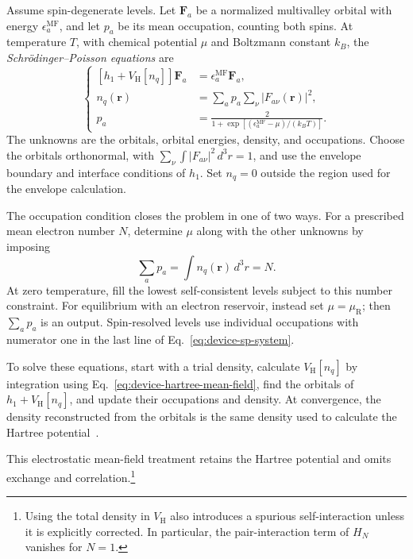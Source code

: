 Assume spin-degenerate levels. Let $\mathbf F_a$ be a normalized
multivalley orbital with energy $\epsilon_a^{\mathrm{MF}}$, and
let $p_a$ be its mean occupation, counting both spins. At
temperature $T$, with chemical potential $\mu$ and Boltzmann
constant $k_B$, the \emph{Schr\"odinger--Poisson equations} are
\begin{equation}
 \left\{
 \begin{aligned}
  [h_1+V_{\mathrm H}[n_q]]\mathbf F_a
       &=\epsilon_a^{\mathrm{MF}}\mathbf F_a,\\[3pt]
  n_q(\mathbf r)
       &=\sum_a p_a\sum_\nu|F_{a\nu}(\mathbf r)|^2,\\[3pt]
  p_a&=\frac{2}{1+\exp[(\epsilon_a^{\mathrm{MF}}-\mu)/(k_BT)]}.
 \end{aligned}
 \right.
 \label{eq:device-sp-system}
\end{equation}
The unknowns are the orbitals, orbital energies, density, and
occupations. Choose the orbitals orthonormal, with
$\sum_\nu\int|F_{a\nu}|^2\,d^3r=1$, and use the envelope
boundary and interface conditions of $h_1$.
Set $n_q=0$ outside the region used for the envelope calculation.

The occupation condition closes the problem in one of two ways.
For a prescribed mean electron number $N$, determine $\mu$
along with the other unknowns by imposing
\begin{equation}
 \sum_a p_a=\int n_q(\mathbf r)\,d^3r=N.
 \label{eq:device-sp-number}
\end{equation}
At zero temperature, fill the lowest self-consistent levels
subject to this number constraint. For equilibrium with an
electron reservoir, instead set $\mu=\mu_{\mathrm R}$; then
$\sum_a p_a$ is an output. Spin-resolved levels use individual
occupations with numerator one in the last line of
Eq.~\eqref{eq:device-sp-system}.

To solve these equations, start with a trial density, calculate
$V_{\mathrm H}[n_q]$ by integration using
Eq.~\eqref{eq:device-hartree-mean-field},
find the orbitals of $h_1+V_{\mathrm H}[n_q]$, and update their
occupations and density. At convergence, the density reconstructed
from the orbitals is the same density used to calculate the
Hartree potential~\cite{QTCADSchrodingerPoisson}.

This electrostatic mean-field treatment retains the Hartree
potential and omits exchange and correlation.\footnote{Using the
total density in $V_{\mathrm H}$ also introduces a spurious
self-interaction unless it is explicitly corrected. In particular,
the pair-interaction term of $H_N$ vanishes for $N=1$.}

